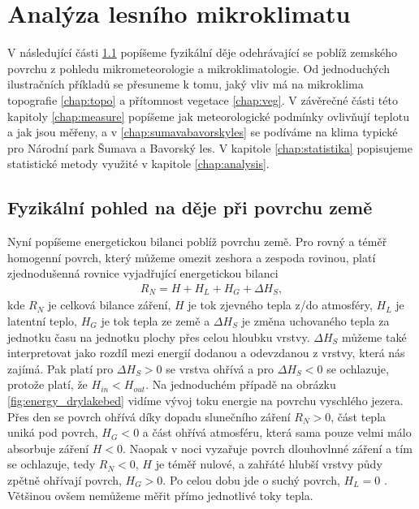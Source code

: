 \chapter{Analýza lesního mikroklimatu}\label{chap:ch1}
V následující části \ref{chap:fyz} popíšeme fyzikální děje odehrávající se poblíž zemského povrchu z pohledu mikrometeorologie a mikroklimatologie. Od jednoduchých ilustračních příkladů se přesuneme k tomu, jaký vliv má na mikroklima topografie \ref{chap:topo} a přítomnost vegetace \ref{chap:veg}. V závěrečné části této kapitoly \ref{chap:measure} popíšeme jak meteorologické podmínky ovlivňují teplotu a jak jsou měřeny, a v \ref{chap:sumavabavorskyles} se podíváme na klima typické pro Národní park Šumava a Bavorský les. V kapitole \ref{chap:statistika} popisujeme statistické metody využité v kapitole \ref{chap:analysis}.

\section{Fyzikální pohled na děje při povrchu země} \label{chap:fyz}
Nyní popíšeme energetickou bilanci poblíž povrchu země. Pro rovný a téměř homogenní povrch, který můžeme omezit zeshora a zespoda rovinou, platí zjednodušenná rovnice vyjadřující energetickou bilanci \parencite{arya2001}
\begin{gather}\label{eq:bilance}
R_N = H + H_L + H_G + \Delta H_S,
\end{gather}
kde $R_N$ je celková bilance záření, $H$ je tok zjevného tepla z/do atmosféry, $H_L$ je latentní teplo, $H_G$ je tok tepla ze země a $\Delta H_S$ je změna uchovaného tepla za jednotku času na jednotku plochy přes celou hloubku vrstvy. $\Delta H_S$ můžeme také interpretovat jako rozdíl mezi energií dodanou a odevzdanou z vrstvy, která nás zajímá. Pak platí pro $\Delta H_S>0$ se vrstva ohřívá a pro $\Delta H_S<0$ se ochlazuje, protože platí, že $H_{in}<H_{out}$. Na jednoduchém případě na obrázku \ref{fig:energy_drylakebed} vidíme vývoj toku energie na povrchu vyschlého jezera. Přes den se povrch ohřívá díky dopadu slunečního záření $R_N>0$, část tepla uniká pod povrch, $H_G<0$ a část ohřívá atmosféru, která sama pouze velmi málo absorbuje záření $H<0$. Naopak v noci vyzařuje povrch dlouhovlnné záření a tím se ochlazuje, tedy $R_N<0$, $H$ je téměř nulové, a zahřáté hlubší vrstvy půdy zpětně ohřívají povrch, $H_G>0$. Po celou dobu jde o suchý povrch, $H_L=0$ \parencite{arya2001}. Většinou ovšem nemůžeme měřit přímo jednotlivé toky tepla.


